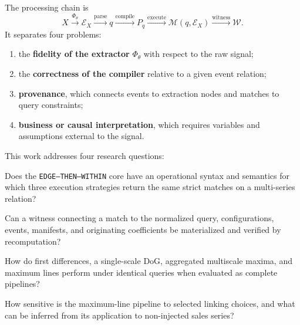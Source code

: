\documentclass[11pt,a4paper]{article}
\newcommand{\Events}{\mathcal{E}}
\newcommand{\Matches}{\mathcal{M}}
\newcommand{\code}[1]{\texttt{#1}}
\begin{document}
The processing chain is
\begin{equation}
 X \xrightarrow{\Phi_{\theta}} \Events_X
 \xrightarrow{\mathrm{parse}} q
 \xrightarrow{\mathrm{compile}} P_q
 \xrightarrow{\mathrm{execute}} \Matches(q,\Events_X)
 \xrightarrow{\mathrm{witness}} \mathcal{W}.
\end{equation}
It separates four problems:
\begin{enumerate}
  \item the \textbf{fidelity of the extractor} $\Phi_{\theta}$ with respect to the raw signal;
  \item the \textbf{correctness of the compiler} relative to a given event relation;
  \item \textbf{provenance}, which connects events to extraction nodes and matches to query constraints;
  \item \textbf{business or causal interpretation}, which requires variables and assumptions external to the signal.
\end{enumerate}

This work addresses four research questions:
\begin{description}[style=nextline,leftmargin=1.3cm]
  \item[RQ1] Does the \code{EDGE--THEN--WITHIN} core have an operational syntax and semantics for which three execution strategies return the same strict matches on a multi-series relation?
  \item[RQ2] Can a witness connecting a match to the normalized query, configurations, events, manifests, and originating coefficients be materialized and verified by recomputation?
  \item[RQ3] How do first differences, a single-scale DoG, aggregated multiscale maxima, and maximum lines perform under identical queries when evaluated as complete pipelines?
  \item[RQ4] How sensitive is the maximum-line pipeline to selected linking choices, and what can be inferred from its application to non-injected sales series?
\end{description}
\end{document}

